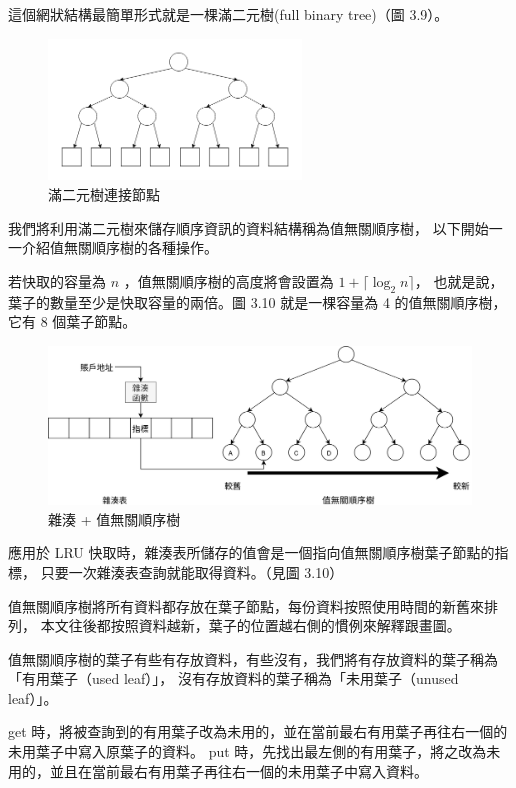 這個網狀結構最簡單形式就是一棵滿二元樹(full binary tree)（圖 3.9）。

\begin{figure}[ht]
\centerline{\includegraphics[width=0.6\textwidth]{滿二元樹}}
\caption{滿二元樹連接節點}
\end{figure}

我們將利用滿二元樹來儲存順序資訊的資料結構稱為值無關順序樹，
以下開始一一介紹值無關順序樹的各種操作。

若快取的容量為 $n$ ，值無關順序樹的高度將會設置為 $1 + \lceil \log_2 n \rceil$，
也就是說，葉子的數量至少是快取容量的兩倍。圖 3.10 就是一棵容量為 4 的值無關順序樹，它有 8 個葉子節點。

\begin{figure}[ht]
\includegraphics[width=\textwidth]{雜湊順序樹}
\caption{雜湊 + 值無關順序樹}
\end{figure}

應用於 LRU 快取時，雜湊表所儲存的值會是一個指向值無關順序樹葉子節點的指標，
只要一次雜湊表查詢就能取得資料。（見圖 3.10）

值無關順序樹將所有資料都存放在葉子節點，每份資料按照使用時間的新舊來排列，
本文往後都按照資料越新，葉子的位置越右側的慣例來解釋跟畫圖。

值無關順序樹的葉子有些有存放資料，有些沒有，我們將有存放資料的葉子稱為「有用葉子（used leaf）」，
沒有存放資料的葉子稱為「未用葉子（unused leaf）」。

get 時，將被查詢到的有用葉子改為未用的，並在當前最右有用葉子再往右一個的未用葉子中寫入原葉子的資料。
put 時，先找出最左側的有用葉子，將之改為未用的，並且在當前最右有用葉子再往右一個的未用葉子中寫入資料。

